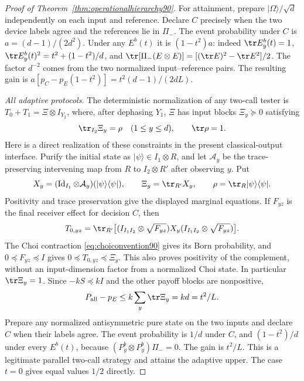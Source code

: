 \begin{proof}[Proof of Theorem~\ref{thm:operationalhierarchy90}]
For attainment, prepare $|\Omega\rangle/\sqrt d$ independently on each
input and reference.  Declare $C$ precisely when the two device labels
agree and the references lie in $\Pi_-$.  The event probability under
$C$ is $a=(d-1)/(2d^2)$.  Under any $E^b(t)$ it is $(1-t^2)a$:
indeed $\tr E_y^b(t)=1$, $\tr E_y^b(t)^2=t^2+(1-t^2)/d$, and
$\tr[\Pi_-(E\otimes E)]=[(\tr E)^2-\tr E^2]/2$.
The factor $d^{-2}$ comes from the two normalized input--reference
pairs.  The resulting gain is
$a[p_C-p_E(1-t^2)]=t^2(d-1)/(2dL)$.

\emph{All adaptive protocols.}
The deterministic normalization of any two-call tester is
$T_0+T_1=\Xi\otimes I_{Y_2}$, where, after dephasing $Y_1$,
$\Xi$ has input blocks $\Xi_y\succeq0$ satisfying
\[
 \tr_{I_2}\Xi_y=\rho\quad(1\le y\le d),\qquad \tr\rho=1.
\]
Here is a direct realization of these constraints in the present
classical-output interface.  Purify the initial state as
$|\psi\rangle\in I_1\otimes R$, and let $\mathcal A_y$ be the
trace-preserving intervening map from $R$ to $I_2\otimes R'$ after
observing $y$.  Put
\[
 X_y=(\operatorname{Id}_{I_1}\otimes\mathcal A_y)
                 (|\psi\rangle\langle\psi|),\qquad
 \Xi_y=\tr_{R'}X_y,\qquad
 \rho=\tr_R|\psi\rangle\langle\psi|.
\]
Positivity and trace preservation give the displayed marginal equations.
If $F_{yz}$ is the final receiver effect for decision $C$, then
\[
 T_{0,yz}=\tr_{R'}\bigl[(I_{I_1I_2}\otimes\sqrt{F_{yz}})
           X_y(I_{I_1I_2}\otimes\sqrt{F_{yz}})\bigr].
\]
The Choi contraction \eqref{eq:choiconvention90} gives its Born
probability, and $0\preceq F_{yz}\preceq I$ gives
$0\preceq T_{0,yz}\preceq\Xi_y$.  This also proves positivity of the
complement, without an input-dimension factor from a normalized Choi
state.  In particular $\tr\Xi_y=1$.
Since $-kS\preceq kI$ and the other payoff blocks are nonpositive,
\[
 P_{\rm all}-p_E\le k\sum_y\tr\Xi_y=kd=t^2/L.
\]
Prepare any normalized antisymmetric pure state on the two inputs and
declare $C$ when their labels agree.  The event probability is $1/d$
under $C$, and $(1-t^2)/d$ under every $E^b(t)$, because
$(P_y^b\otimes P_y^b)\Pi_-=0$.  The gain is $t^2/L$.
This is a legitimate parallel two-call strategy and attains the
adaptive upper.  The case $t=0$ gives equal values $1/2$ directly.
\end{proof}

